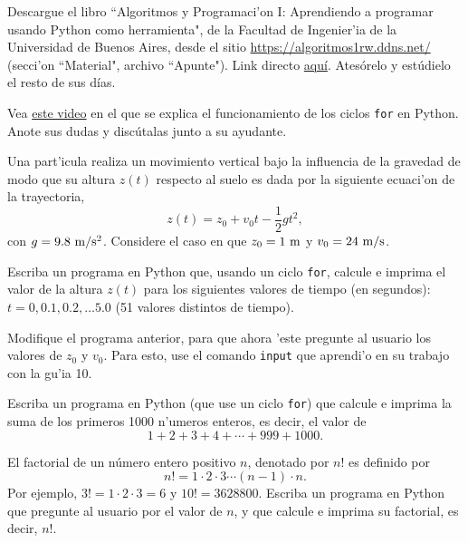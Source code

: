 \documentclass[11pt]{exam}
\begin{document}
\begin{questions}
\item Descargue el libro ``Algoritmos y Programaci'on I: Aprendiendo a programar usando Python como herramienta", de la Facultad de Ingenier'ia de la Universidad de Buenos Aires, desde el sitio \url{https://algoritmos1rw.ddns.net/} (secci'on ``Material", archivo ``Apunte"). Link directo \href{https://drive.google.com/file/d/0B0KKEIBDHL7tdEQ3bFZ2M3VrZzA/view}{aqu\'i}. Atesórelo y estúdielo el resto de sus días.

\item Vea \href{https://udec.instructure.com/courses/17852/pages/ciclos-for}{este video} en el que se explica el funcionamiento de los ciclos \texttt{for} en Python. Anote sus dudas y discútalas junto a su ayudante.

\item Una part'icula realiza un movimiento vertical bajo la influencia de la gravedad de modo que su altura $z(t)$ respecto al suelo es dada por la siguiente ecuaci'on de la trayectoria,
\begin{equation}
z(t)=z_0 + v_0 t -\frac{1}{2}gt^2,
\end{equation}
con $g=9.8 {\ \rm m/s^2}$. Considere el caso en que $z_0=1 {\ \rm m}$ y $v_0=24 {\ \rm m/s}$.

Escriba un programa en Python que, usando un ciclo \texttt{for}, calcule e imprima el valor de la altura $z(t)$ para los siguientes valores de tiempo (en segundos): $t=0, 0.1, 0.2, \dots 5.0$ (51 valores distintos de tiempo).

\item Modifique el programa anterior, para que ahora 'este pregunte al usuario los valores de $z_0$ y $v_0$. Para esto, use el comando \texttt{input} que aprendi'o en su trabajo con la gu'ia 10.
\item Escriba un programa en Python (que use un ciclo \texttt{for}) que calcule e imprima la suma de los primeros 1000 n'umeros enteros, es decir, el valor de 
\begin{equation}
1 + 2 + 3 + 4  + \cdots + 999 + 1000.
\end{equation}

\item El factorial de un número entero positivo $n$, denotado por $n!$ es definido por
\begin{equation}
n!=1\cdot 2\cdot 3\cdots (n-1)\cdot n.
\end{equation}
Por ejemplo, $3!=1\cdot 2\cdot 3=6$ y $10!=3628800$.
Escriba un programa en Python que pregunte al usuario por el valor de $n$, y que calcule e imprima su factorial, es decir, $n!$.


\end{questions}
\end{document}
